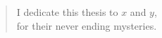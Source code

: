 \vspace*{\fill}
\vspace*{-2in}
\begin{quote}
    \center
    I dedicate this thesis to $x$ and $y$, \\
    for their never ending mysteries.
\end{quote}
\vspace*{\fill}
